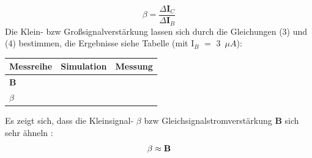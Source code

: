 \begin{equation}
\textbf{$\beta$} = \frac{\textbf{$\Delta$I$_C$}}{\textbf{$\Delta$I$_B$}}
\end{equation}
Die Klein- bzw Gro\ss signalverst\"arkung lassen sich durch die Gleichungen (3) und (4) bestimmen, die Ergebnisse siehe Tabelle (mit I$_B$ $=$ 3~$\mu A$): \\
\begin{center}
\begin{tabular}{|l|l|l|}
\hline
Messreihe & Simulation & Messung \\
\hline 
\textbf{B} & & \\
\hline
$\beta$ & & \\
\hline
\end{tabular}
\end{center}
Es zeigt sich, dass die Kleinsignal- \textbf{$\beta$} bzw Gleichsignalstromverst\"arkung \textbf{B} sich sehr \"ahneln :\begin{equation*}
\beta \approx \text{\textbf{B}}
\end{equation*} 